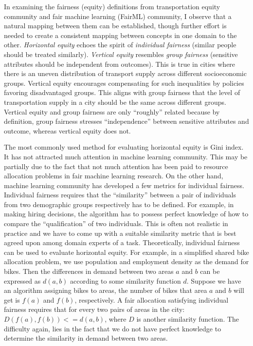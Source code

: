 \documentclass[11pt]{article}
\begin{document}
In examining the fairness (equity) definitions from transportation equity community and fair machine learning (FairML) community, I observe that a natural mapping between them can be established, though further effort is needed to create a consistent mapping between concepts in one domain to the other. \textit{Horizontal equity} echoes the spirit of \textit{individual fairness} (similar people should be treated similarly). \textit{Vertical equity} resembles \textit{group fairness} (sensitive attributes should be independent from outcomes). This is true in cities where there is an uneven distribution of transport supply across different socioeconomic groups. Vertical equity encourages compensating for such inequalities by policies favoring disadvantaged groups. This aligns with group fairness that the level of transportation supply in a city should be the same across different groups. Vertical equity and group fairness are only ``roughly'' related because by definition, group fairness stresses ``independence'' between sensitive attributes and outcome, whereas vertical equity does not.   


The most commonly used method for evaluating horizontal equity is Gini index. It has not attracted much attention in machine learning community. This may be partially due to the fact that not much attention has been paid to resource allocation problems in fair machine learning research. On the other hand, machine learning community has developed a few metrics for individual fairness. Individual fairness requires that the ``similarity'' between a pair of individuals from two demographic groups respectively has to be defined. For example, in making hiring decisions, the algorithm has to possess perfect knowledge of how to compare the ``qualification'' of two individuals. This is often not realistic in  practice and we have to come up with a suitable similarity metric that is best agreed upon among domain experts of a task. Theoretically, individual fairness can be used to evaluate horizontal equity. For example, in a simplified shared bike allocation problem, we use population and employment density as the demand for bikes. Then the differences in demand between two areas $a$ and $b$ can be expressed as $d(a, b)$ according to some similarity function $d$. Suppose we have an algorithm assigning bikes to areas, the number of bikes that area $a$ and $b$ will get is $f(a)$ and $f(b)$, respectively. A fair allocation satisfying individual fairness requires that for every two pairs of areas in the city: $D(f(a) , f(b)) <= d(a,b)$, where $D$ is another similarity function. The difficulty again, lies in the fact that we do not have perfect knowledge to determine the similarity in demand between two areas. 
\end{document}

